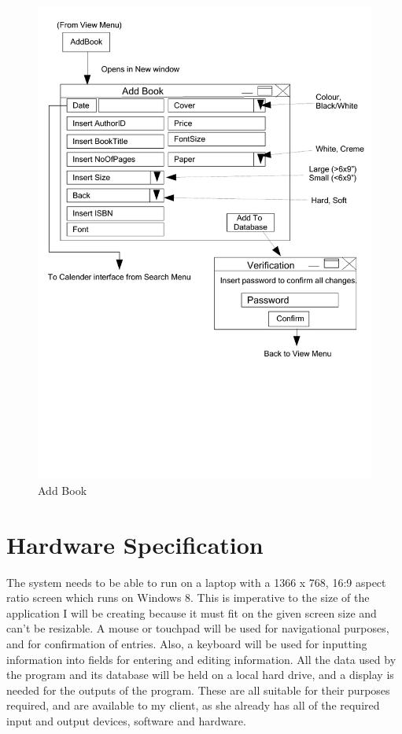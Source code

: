 \begin{figure}[H]
    \caption{Add Book} \label{AddBook.pdf}
    \includegraphics[width=\textwidth]{./Design/UserInterfaceDesign/AddBook.pdf}
\end{figure}

\section{Hardware Specification}

The system needs to be able to run on a laptop with a 1366 x 768, 16:9 aspect ratio screen which runs on Windows 8. This is imperative to the size of the application I will be creating because it must fit on the given screen size and can't be resizable. A mouse or touchpad will be used for navigational purposes, and for confirmation of entries. Also, a keyboard will be used for inputting information into fields for entering and editing information. All the data used by the program and its database will be held on a local hard drive, and a display is needed for the outputs of the program. These are all suitable for their purposes required, and are available to my client, as she already has all of the required input and output devices, software and hardware.

